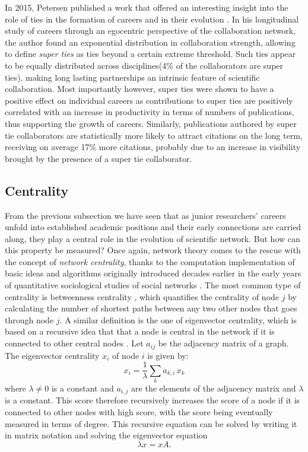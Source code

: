  In 2015, Petersen published a work that offered an interesting insight
into the role of ties in the formation of careers and in their evolution  \cite{Petersen25082015}. In his longitudinal study of careers through an egocentric 
perspective of the collaboration network, the author found an exponential distribution in collaboration strength, allowing to define \textit{super ties} as
ties beyond a certain extreme threshold. Such ties appear to be equally distributed across disciplines(4\% of the collaborators are super ties), making
long lasting partnerships an intrinsic feature of scientific collaboration. Most importantly however, super ties were shown to have a positive effect
on individual careers as contributions to super ties are positively correlated with an increase in productivity in terms of numbers of publications, thus supporting
the growth of careers. Similarly, publications authored by super tie collaborators are statistically more likely to attract citations on the long term, receiving
on average 17\% more citations, probably due to an increase in visibility brought by the presence of a super tie collaborator.



 

\subsection{Centrality}\label{sec:centrality}
From the previous subsection we have seen that as junior researchers' careers unfold into
established academic positions and their early connections are carried along, they play a central role in the evolution of scientific network. 
But how can this property be measured? Once again, network theory comes to the rescue with the concept of \textit{network centrality}, thanks
to the computation implementation \cite{Newman200539,doi:10.1080/0022250X.2001.9990249} of basic ideas and algorithms originally introduced
decades earlier in the early years of quantitative sociological studies of social networks \cite{10.2307/3033543,Katz1953}.
The most common type of centrality is betweenness centrality \cite{10.2307/3033543}, which quantifies the centrality of node $j$ by calculating the number of shortest paths
between any two other nodes that goes through node $j$. A similar definition is the one of eigenvector centrality, which is based on a recursive idea
that that a node is central in the network if it is connected to other central nodes \cite{doi:10.1080/0022250X.1972.9989806}. 
Let $a_{ij}$ be the adjacency matrix of a graph. The eigenvector centrality $x_{i}$ of node $i$ is given by: $$x_i = \frac{1}{\lambda} \sum_k a_{k,i} \, x_k$$ where $\lambda \neq 0$ is a constant
and $a_{i,j}$ are the elements of the adjacency matrix and $\lambda$ is a constant. This score therefore recursively increases the score of a node if it is connected
to other nodes with high score, with the score being eventually measured in terms of degree.
This recursive equation can be solved by writing it in matrix notation and solving the eigenvector equation \cite{Ruhnau2000357} $$\lambda x = x A.$$

